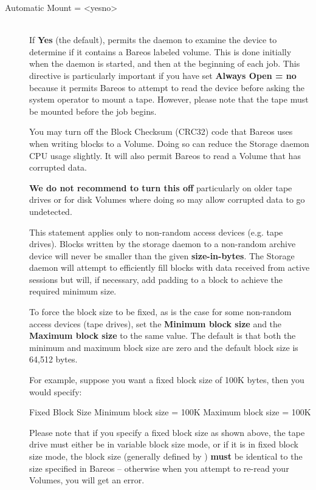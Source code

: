 \begin{description}
\item [Automatic Mount = {\textless}yes{\textbar}no{\textgreater}] \hfill \\
If {\bf Yes} (the default), permits the daemon to examine the device to
determine if it contains a Bareos labeled volume.  This is done
initially when the daemon is started, and then at the beginning of each
job.  This directive is particularly important if you have set
{\bf Always Open = no} because it permits Bareos to attempt to read the
device before asking the system operator to mount a tape.  However,
please note that the tape must be mounted before the job begins.


You may turn off the Block Checksum (CRC32) code that Bareos uses when
writing blocks to a Volume. Doing so can reduce the Storage daemon CPU usage
slightly.  It will also permit Bareos to read a Volume that has corrupted
data.

\textbf{We do not recommend to turn this off} particularly on older tape
drives or for disk Volumes where doing so may allow corrupted data to go
undetected.

This statement applies only to non-random access devices (e.g.
tape drives).  Blocks written by the storage daemon to a non-random
archive device will never be smaller than the given {\bf size-in-bytes}.
The Storage daemon will attempt to efficiently fill blocks with data
received from active sessions but will, if necessary, add padding to a
block to achieve the required minimum size.

To force the block size to be fixed, as is the case for some non-random
access devices (tape drives), set the {\bf Minimum block size} and the
{\bf Maximum block size} to the same value.  The default
is that both the minimum and maximum block size are zero and the default
block size is 64,512 bytes.

For  example, suppose you want a fixed block size of 100K bytes, then you
would specify:

\begin{bconfig}{Fixed Block Size}
Minimum block size = 100K
Maximum block size = 100K
\end{bconfig}

Please note that if you specify a fixed block size as shown above,  the tape
drive must either be in variable block size mode, or  if it is in fixed block
size mode, the block size (generally  defined by ) {\bf must} be
identical to the size specified  in Bareos -- otherwise when you attempt to
re-read your Volumes,  you will get an error.


\end{description}
